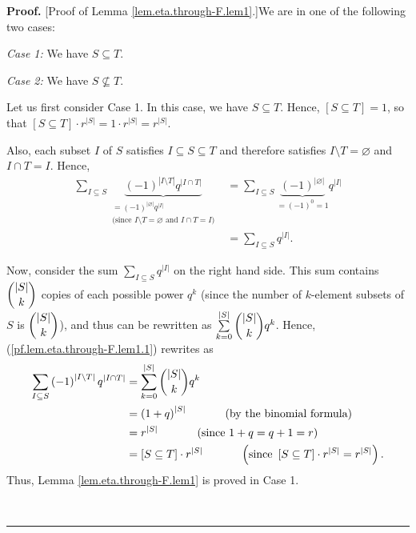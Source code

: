 \documentclass[numbers=enddot,12pt,final,onecolumn,notitlepage]{scrartcl}%
\theoremstyle{definition}
\newenvironment{proof}[1][Proof]{\noindent\textbf{#1.} }{\ \rule{0.5em}{0.5em}}
\let\sumnonlimits\sum
\renewcommand{\sum}{\sumnonlimits\limits}
\newenvironment{vershort}{}{}
\begin{document}
\begin{vershort}


\begin{proof}
[Proof of Lemma \ref{lem.eta.through-F.lem1}.]We are in one of the following
two cases:

\textit{Case 1:} We have $S\subseteq T$.

\textit{Case 2:} We have $S\not \subseteq T$.

Let us first consider Case 1. In this case, we have $S\subseteq T$. Hence,
$\left[  S\subseteq T\right]  =1$, so that $\left[  S\subseteq T\right]  \cdot
r^{\left\vert S\right\vert }=1\cdot r^{\left\vert S\right\vert }=r^{\left\vert
S\right\vert }$.

Also, each subset $I$ of $S$ satisfies $I\subseteq S\subseteq T$ and therefore
satisfies $I\setminus T=\varnothing$ and $I\cap T=I$. Hence,%
\begin{align}
\sum_{I\subseteq S}\underbrace{\left(  -1\right)  ^{\left\vert I\setminus
T\right\vert }q^{\left\vert I\cap T\right\vert }}_{\substack{=\left(
-1\right)  ^{\left\vert \varnothing\right\vert }q^{\left\vert I\right\vert
}\\\text{(since }I\setminus T=\varnothing\text{ and }I\cap T=I\text{)}}}  &
=\sum_{I\subseteq S}\underbrace{\left(  -1\right)  ^{\left\vert \varnothing
\right\vert }}_{=\left(  -1\right)  ^{0}=1}q^{\left\vert I\right\vert
}\nonumber\\
&  =\sum_{I\subseteq S}q^{\left\vert I\right\vert }.
\label{pf.lem.eta.through-F.lem1.1}%
\end{align}


Now, consider the sum $\sum_{I\subseteq S}q^{\left\vert I\right\vert }$ on the
right hand side. This sum contains $\dbinom{\left\vert S\right\vert }{k}$
copies of each possible power $q^{k}$ (since the number of $k$-element subsets
of $S$ is $\dbinom{\left\vert S\right\vert }{k}$), and thus can be rewritten
as $\sum_{k=0}^{\left\vert S\right\vert }\dbinom{\left\vert S\right\vert }%
{k}q^{k}$. Hence, (\ref{pf.lem.eta.through-F.lem1.1}) rewrites as
\begin{align*}
\sum_{I\subseteq S}\left(  -1\right)  ^{\left\vert I\setminus T\right\vert
}q^{\left\vert I\cap T\right\vert }  &  =\sum_{k=0}^{\left\vert S\right\vert
}\dbinom{\left\vert S\right\vert }{k}q^{k}\\
&  =\left(  1+q\right)  ^{\left\vert S\right\vert }\ \ \ \ \ \ \ \ \ \ \left(
\text{by the binomial formula}\right) \\
&  =r^{\left\vert S\right\vert }\ \ \ \ \ \ \ \ \ \ \left(  \text{since
}1+q=q+1=r\right) \\
&  =\left[  S\subseteq T\right]  \cdot r^{\left\vert S\right\vert
}\ \ \ \ \ \ \ \ \ \ \left(  \text{since }\left[  S\subseteq T\right]  \cdot
r^{\left\vert S\right\vert }=r^{\left\vert S\right\vert }\right)  .
\end{align*}
Thus, Lemma \ref{lem.eta.through-F.lem1} is proved in Case 1.


\end{proof}
\end{vershort}
\end{document}

